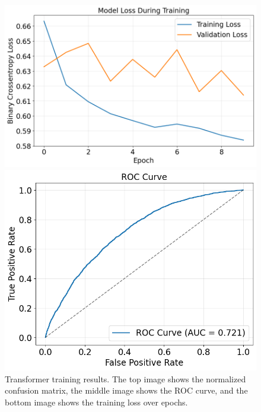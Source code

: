 \documentclass{pracalicmgr}
\begin{document}
\begin{figure}[H]
    \centering
    \begin{minipage}[t]{0.7\textwidth}
        \centering
        \includegraphics[width=\textwidth]{src/transformerLoss.png}
    \end{minipage}
    \hfill
    \begin{minipage}[t]{0.7\textwidth}
        \centering
        \includegraphics[width=\textwidth]{src/transformerROCurve.png}
    \end{minipage}
    \caption{Transformer training results. The top image shows the normalized confusion matrix, the middle image shows the ROC curve, and the bottom image shows the training loss over epochs.}
    \label{fig:tranformerResults}
\end{figure}
\end{document}
